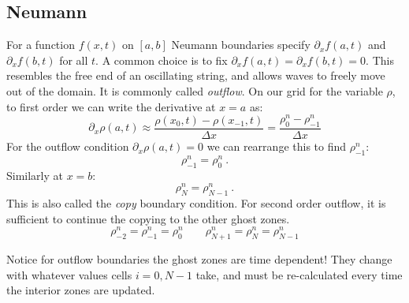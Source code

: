 \documentclass{article}
\begin{document}
\subsection{Neumann}

For a function $f(x,t)$ on $[a,b]$ Neumann boundaries specify $\partial_x f(a,t)$ and $\partial_x f(b,t)$ for all $t$. A common choice is to fix $\partial_x f(a,t) = \partial_x f(b,t) = 0$.  This resembles the free end of an oscillating string, and allows waves to freely move out of the domain. It is commonly called \emph{outflow}.  On our grid for the variable $\rho$, to first order we can write the derivative at $x=a$ as:
\begin{equation}
	\partial_x \rho(a,t) \approx \frac{\rho(x_0,t) - \rho(x_{-1},t)}{\Delta x} = \frac{\rho_0^n - \rho_{-1}^n}{\Delta x}
\end{equation}
For the outflow condition $\partial_x \rho(a,t)=0$ we can rearrange this to find $\rho_{-1}^n$:
\begin{equation}
	\rho_{-1}^n = \rho_{0}^n\ .
\end{equation}
Similarly at $x=b$:
\begin{equation}
	\rho_{N}^n = \rho_{N-1}^n\ .
\end{equation}
This is also called the \emph{copy} boundary condition.  For second order outflow, it is sufficient to continue the copying to the other ghost zones.
\begin{equation}
	\rho_{-2}^n = \rho_{-1}^n = \rho_{0}^n\qquad \rho_{N+1}^n = \rho_{N}^n = \rho_{N-1}^n
\end{equation}

Notice for outflow boundaries the ghost zones are time dependent!  They change with whatever values cells $i=0,N-1$ take, and must be re-calculated every time the interior zones are updated.
\end{document}
